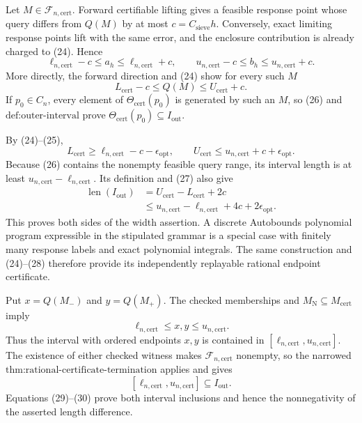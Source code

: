 Let \(M\in\mathcal F_{n,\mathrm{cert}}\).  Forward certifiable lifting gives a feasible response point whose query differs from \(Q(M)\) by at most \(c=C_{\mathrm{sieve}}h\).  Conversely, exact limiting response points lift with the same error, and the enclosure contribution is already charged to (24).  Hence
\[
\ell_{n,\mathrm{cert}}-c\leq a_h\leq\ell_{n,\mathrm{cert}}+c,
\qquad
u_{n,\mathrm{cert}}-c\leq b_h\leq u_{n,\mathrm{cert}}+c.          \tag{25}
\]
More directly, the forward direction and (24) show for every such \(M\)
\[
L_{\mathrm{cert}}-c\leq Q(M)\leq U_{\mathrm{cert}}+c.            \tag{26}
\]
If \(p_0\in C_n\), every element of \(\Theta_{\mathrm{cert}}(p_0)\) is generated by such an \(M\), so (26) and \(\text{def:outer-interval}\) prove \(\Theta_{\mathrm{cert}}(p_0)\subseteq I_{\mathrm{out}}\).

By (24)--(25),
\[
L_{\mathrm{cert}}\geq\ell_{n,\mathrm{cert}}-c-\epsilon_{\mathrm{opt}},
\qquad
U_{\mathrm{cert}}\leq u_{n,\mathrm{cert}}+c+\epsilon_{\mathrm{opt}}. \tag{27}
\]
Because (26) contains the nonempty feasible query range, its interval length is at least \(u_{n,\mathrm{cert}}-\ell_{n,\mathrm{cert}}\).  Its definition and (27) also give
\[
\begin{aligned}
\operatorname{len}(I_{\mathrm{out}})
&=U_{\mathrm{cert}}-L_{\mathrm{cert}}+2c\\
&\leq u_{n,\mathrm{cert}}-\ell_{n,\mathrm{cert}}+4c+2\epsilon_{\mathrm{opt}}.
\end{aligned}                                                       \tag{28}
\]
This proves both sides of the width assertion.  A discrete Autobounds polynomial program expressible in the stipulated grammar is a special case with finitely many response labels and exact polynomial integrals.  The same construction and (24)--(28) therefore provide its independently replayable rational endpoint certificate.

Put \(x=Q(M_-)\) and \(y=Q(M_+)\).  The checked memberships and \(M_{\mathrm N}\subseteq M_{\mathrm{cert}}\) imply
\[
\ell_{n,\mathrm{cert}}\leq x,y\leq u_{n,\mathrm{cert}}.          \tag{29}
\]
Thus the interval with ordered endpoints \(x,y\) is contained in \([\ell_{n,\mathrm{cert}},u_{n,\mathrm{cert}}]\).  The existence of either checked witness makes \(\mathcal F_{n,\mathrm{cert}}\) nonempty, so the narrowed \(\text{thm:rational-certificate-termination}\) applies and gives
\[
[\ell_{n,\mathrm{cert}},u_{n,\mathrm{cert}}]\subseteq I_{\mathrm{out}}. \tag{30}
\]
Equations (29)--(30) prove both interval inclusions and hence the nonnegativity of the asserted length difference.

